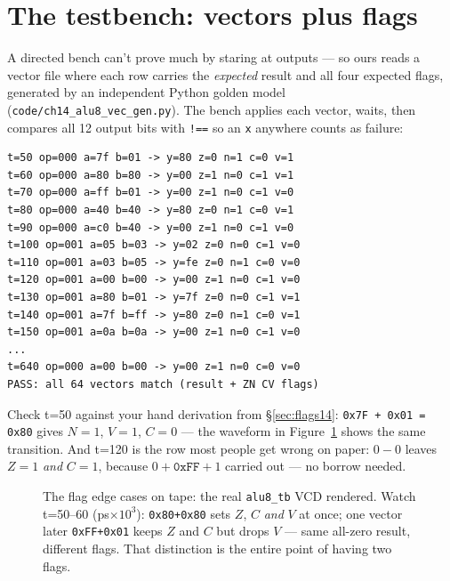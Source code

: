 \section{The testbench: vectors plus flags}\label{sec:tb14}

A directed bench can't prove much by staring at outputs --- so ours
reads a vector file where each row carries the \emph{expected} result
and all four expected flags, generated by an independent Python
golden model (\texttt{code/ch14\_alu8\_vec\_gen.py}). The bench
applies each vector, waits, then compares all 12 output bits with
\texttt{!==} so an \texttt{x} anywhere counts as failure:

\begin{lstlisting}[caption={Real run of \ttfamily ch14\_alu8\_tb.v ---
the directed vectors. Each row prints what was applied and what came
back; the verdict counts checks, not hopes.}]
t=50 op=000 a=7f b=01 -> y=80 z=0 n=1 c=0 v=1
t=60 op=000 a=80 b=80 -> y=00 z=1 n=0 c=1 v=1
t=70 op=000 a=ff b=01 -> y=00 z=1 n=0 c=1 v=0
t=80 op=000 a=40 b=40 -> y=80 z=0 n=1 c=0 v=1
t=90 op=000 a=c0 b=40 -> y=00 z=1 n=0 c=1 v=0
t=100 op=001 a=05 b=03 -> y=02 z=0 n=0 c=1 v=0
t=110 op=001 a=03 b=05 -> y=fe z=0 n=1 c=0 v=0
t=120 op=001 a=00 b=00 -> y=00 z=1 n=0 c=1 v=0
t=130 op=001 a=80 b=01 -> y=7f z=0 n=0 c=1 v=1
t=140 op=001 a=7f b=ff -> y=80 z=0 n=1 c=0 v=1
t=150 op=001 a=0a b=0a -> y=00 z=1 n=0 c=1 v=0
...
t=640 op=000 a=00 b=00 -> y=00 z=1 n=0 c=0 v=0
PASS: all 64 vectors match (result + ZN CV flags)
\end{lstlisting}

Check t=50 against your hand derivation from \S\ref{sec:flags14}:
\texttt{0x7F + 0x01 = 0x80} gives $N=1$, $V=1$, $C=0$ --- the waveform
in Figure~\ref{fig:wave14} shows the same transition. And t=120 is the
row most people get wrong on paper: $0-0$ leaves $Z=1$ \emph{and}
$C=1$, because $0+\texttt{0xFF}+1$ carried out --- no borrow needed.

\begin{figure}[htbp]
\centering

\caption{The flag edge cases on tape: the real \texttt{alu8\_tb} VCD
rendered. Watch t=50--60 (ps$\times10^3$): \texttt{0x80+0x80} sets
$Z$, $C$ \emph{and} $V$ at once; one vector later \texttt{0xFF+0x01}
keeps $Z$ and $C$ but drops $V$ --- same all-zero result, different
flags. That distinction is the entire point of having two flags.}
\label{fig:wave14}
\end{figure}

